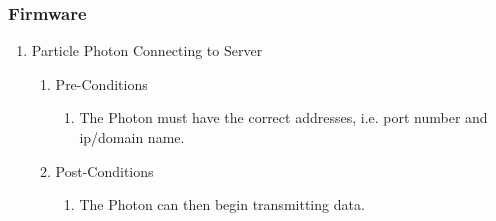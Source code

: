 \documentclass{article}
\begin{document}
	\subsubsection{Firmware}
	\begin{enumerate}
	\item	Particle Photon Connecting to Server	
	\begin{enumerate}
		\item  Pre-Conditions
		\begin{enumerate}
			\item	The Photon must have the correct addresses, i.e. port number and ip/domain name.
		\end{enumerate}
		\item  Post-Conditions		
		\begin{enumerate}
			\item	The Photon can then begin transmitting data.
		\end{enumerate}
	\end{enumerate}
\end{enumerate}
\end{document}
